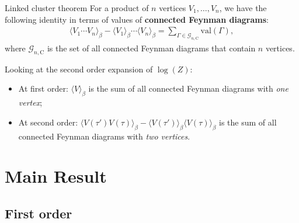 \documentclass{beamer}
\begin{document}
\begin{frame}
	\begin{block}{Linked cluster theorem}
		For a product of $n$ vertices $V_1,\ldots,V_n$, we have the following identity in
		terms of values of \textbf{connected Feynman diagrams}:
		\begin{align*}
			\langle V_1\cdots V_n\rangle_\beta - \langle V_1\rangle_\beta\cdots\langle V_n\rangle_\beta
			= \sum_{\Gamma\in\mathcal{G}_{n,\mathrm{C}}}\mathrm{val}(\Gamma),
		\end{align*}
		where $\mathcal{G}_{n,\mathrm{C}}$ is the set of all connected Feynman diagrams that
		contain $n$ vertices.
	\end{block}
	Looking at the second order expansion of $\log(Z)$:
	\begin{itemize}
		\item At first order: $\langle V\rangle_\beta$ is the sum of all connected Feynman
			diagrams with \textit{one vertex};
		\item At second order: $\langle V(\tau')V(\tau)\rangle_\beta-
			\langle V(\tau')\rangle_\beta\langle V(\tau)\rangle_\beta$ is the sum of all
			connected Feynman diagrams with \textit{two vertices}.
	\end{itemize}
\end{frame}

\section{Main Result}

\subsection{First order}
\end{document}
